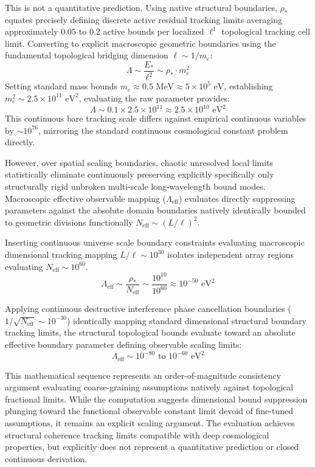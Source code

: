 \documentclass[
]{article}
\begin{document}
This is not a quantitative prediction. Using native structural
boundaries, \(\rho_*\) equates precisely defining discrete active
residual tracking limits averaging approximately
\(0.05 \text{ to } 0.2\) active bounds per localized \(\ell^1\)
topological tracking cell limit. Converting to explicit macroscopic
geometric boundaries using the fundamental topological bridging
dimension \(\ell \sim 1/m_e\):
\[ \Lambda \sim \frac{E_*}{\ell^2} \sim \rho_* \cdot m_e^2 \] Setting
standard mass bounds
\(m_e \approx 0.5 \text{ MeV} \approx 5 \times 10^5 \text{ eV}\),
establishing \(m_e^2 \sim 2.5 \times 10^{11} \text{ eV}^2\), evaluating
the raw parameter provides:
\[ \Lambda \sim 0.1 \times 2.5 \times 10^{11} \approx 2.5 \times 10^{10} \text{ eV}^2 \]
This continuous bare tracking scale differs against empirical continuous
variables by \(\sim 10^{76}\), mirroring the standard continuous
cosmological constant problem directly.

However, over spatial scaling boundaries, chaotic unresolved local
limits statistically eliminate continuously preserving explicitly
specifically only structurally rigid unbroken multi-scale
long-wavelength bound modes. Macroscopic effective observable mapping
(\(\Lambda_{\text{eff}}\)) evaluates directly suppressing parameters
against the absolute domain boundaries natively identically bounded to
geometric divisions functionally \(N_{\text{eff}} \sim (L/\ell)^2\).

Inserting continuous universe scale boundary constraints evaluating
macroscopic dimensional tracking mapping \(L/\ell \sim 10^{30}\)
isolates independent array regions evaluating
\(N_{\text{eff}} \sim 10^{60}\).
\[ \Lambda_{\text{eff}} \sim \frac{\rho_*}{N_{\text{eff}}} \sim \frac{10^{10}}{10^{60}} \approx 10^{-50} \text{ eV}^2 \]

Applying continuous destructive interference phase cancellation
boundaries (\(1/\sqrt{N_{\text{eff}}} \sim 10^{-30}\)) identically
mapping standard dimensional structural boundary tracking limits, the
structural topological bounds evaluate toward an absolute effective
boundary parameter defining observable scaling limits:
\[ \Lambda_{\text{eff}} \sim 10^{-80} \text{ to } 10^{-60} \text{ eV}^2 \]

This mathematical sequence represents an order-of-magnitude consistency
argument evaluating coarse-graining assumptions natively against
topological fractional limits. While the computation suggests
dimensional bound suppression plunging toward the functional observable
constant limit devoid of fine-tuned assumptions, it remains an explicit
scaling argument. The evaluation achieves structural coherence tracking
limits compatible with deep cosmological properties, but explicitly does
not represent a quantitative prediction or closed continuous derivation.
\end{document}
